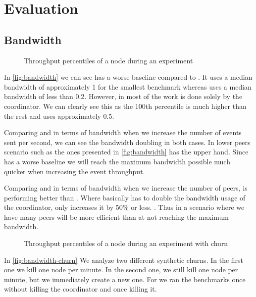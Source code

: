 
\section{Evaluation}
\subsection{Bandwidth}
\begin{figure}[h]
	\centering
	
	\vspace{-2mm} 
	\caption{Throughput percentiles of a node during an experiment}
	\vspace{-2mm} 
	\label{fig:bandwidth}
\end{figure}
In \autoref{fig:bandwidth} we can see \epto has a worse baseline compared to \jgroups. It uses a median bandwidth of approximately \SI{1}{\mbps} for the smallest benchmark whereas \jgroups uses a median bandwidth of less than \SI{0.2}{\mbps}. However, in \jgroups most of the work is done solely by the coordinator. We can clearly see this as the 100th percentile is much higher than the rest and uses approximately \SI{.5}{\mbps}.

Comparing \epto and \jgroups in terms of bandwidth when we increase the number of events sent per second, we can see the bandwidth doubling in both cases. In lower peers scenario such as the ones presented in \autoref{fig:bandwidth} \jgroups has the upper hand. Since \epto has a worse baseline we will reach the maximum bandwidth possible much quicker when increasing the event throughput.

Comparing \epto and \jgroups in terms of bandwidth when we increase the number of peers, \epto is performing better than \jgroups. Where \jgroups basically has to double the bandwidth usage of the coordinator, \epto only increases it by 50\% or less. . Thus in a scenario where we have many peers \epto will be more efficient than \jgroups at not reaching the maximum bandwidth.

\begin{figure}
	\centering
	
	\vspace{-2mm} 
	\caption{Throughput percentiles of a node during an experiment with churn}
	\vspace{-2mm} 
	\label{fig:bandwidth-churn}
\end{figure}

In \autoref{fig:bandwidth-churn} We analyze two different synthetic churns. In the first one we kill one node per minute. In the second one, we still kill one node per minute, but we immediately create a new one. For \jgroups we ran the benchmarks once without killing the coordinator and once killing it.

